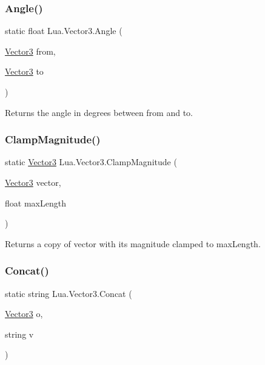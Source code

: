 \subsubsection{\texorpdfstring{Angle()}{Angle()}}
{\footnotesize\ttfamily static float Lua.\+Vector3.\+Angle (\begin{DoxyParamCaption}\item[{\mbox{\hyperlink{class_lua_1_1_vector3}{Vector3}}}]{from,  }\item[{\mbox{\hyperlink{class_lua_1_1_vector3}{Vector3}}}]{to }\end{DoxyParamCaption})\hspace{0.3cm}{\ttfamily [static]}}



Returns the angle in degrees between from and to. 

\mbox{\label{class_lua_1_1_vector3_ab4ac1349372b28a8e490a94e96d950aa}} 
\subsubsection{\texorpdfstring{ClampMagnitude()}{ClampMagnitude()}}
{\footnotesize\ttfamily static \mbox{\hyperlink{class_lua_1_1_vector3}{Vector3}} Lua.\+Vector3.\+Clamp\+Magnitude (\begin{DoxyParamCaption}\item[{\mbox{\hyperlink{class_lua_1_1_vector3}{Vector3}}}]{vector,  }\item[{float}]{max\+Length }\end{DoxyParamCaption})\hspace{0.3cm}{\ttfamily [static]}}



Returns a copy of vector with its magnitude clamped to max\+Length. 

\mbox{\label{class_lua_1_1_vector3_a7a6a85bde6d3a1072d52ebf902f291e0}} 
\subsubsection{\texorpdfstring{Concat()}{Concat()}\hspace{0.1cm}{\footnotesize\ttfamily [1/3]}}
{\footnotesize\ttfamily static string Lua.\+Vector3.\+Concat (\begin{DoxyParamCaption}\item[{\mbox{\hyperlink{class_lua_1_1_vector3}{Vector3}}}]{o,  }\item[{string}]{v }\end{DoxyParamCaption})\hspace{0.3cm}{\ttfamily [static]}}



